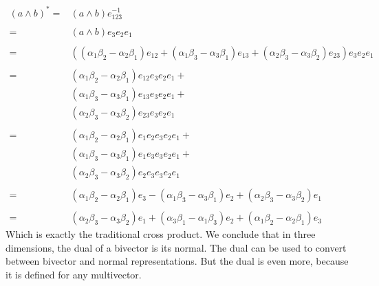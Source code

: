 \documentclass[10pt]{report}
\begin{document}
\begin{align}
    \label{eq:dual in 3d}
    (a\wedge b)^* = &(a\wedge b)e_{123}^{-1}   \nonumber\\
                  \nonumber\\
                  = &(a\wedge b)e_3e_2e_1   \nonumber\\
                  \nonumber\\
                  = &((\alpha_{1}\beta_{2} - \alpha_{2}\beta_{1})e_{12} +
                     (\alpha_{1}\beta_{3} - \alpha_{3}\beta_{1})e_{13} +
                     (\alpha_{2}\beta_{3} - \alpha_{3}\beta_{2})e_{23}) e_3e_2e_1   \nonumber\\
                  \nonumber\\
                  = &(\alpha_{1}\beta_{2} - \alpha_{2}\beta_{1})e_{12}e_3e_2e_1 + \nonumber\\
                    &(\alpha_{1}\beta_{3} - \alpha_{3}\beta_{1})e_{13}e_3e_2e_1 + \nonumber\\
                    &(\alpha_{2}\beta_{3} - \alpha_{3}\beta_{2})e_{23}e_3e_2e_1   \nonumber\\
                  \nonumber\\
                  = &(\alpha_{1}\beta_{2} - \alpha_{2}\beta_{1})e_1e_2e_3e_2e_1 + \nonumber\\
                    &(\alpha_{1}\beta_{3} - \alpha_{3}\beta_{1})e_1e_3e_3e_2e_1 + \nonumber\\
                    &(\alpha_{2}\beta_{3} - \alpha_{3}\beta_{2})e_2e_3e_3e_2e_1   \nonumber\\
                  \nonumber\\
                  = &(\alpha_{1}\beta_{2} - \alpha_{2}\beta_{1})e_3 -
                     (\alpha_{1}\beta_{3} - \alpha_{3}\beta_{1})e_2 +
                     (\alpha_{2}\beta_{3} - \alpha_{3}\beta_{2})e_1 \nonumber \\
                  \nonumber\\
                  = &(\alpha_{2}\beta_{3} - \alpha_{3}\beta_{2})e_1 +
                     (\alpha_{3}\beta_{1} - \alpha_{1}\beta_{3})e_2 +
                     (\alpha_{1}\beta_{2} - \alpha_{2}\beta_{1})e_3
\end{align}
Which is exactly the traditional cross product. We conclude that in three
dimensions, the dual of a bivector is its normal. The dual can be
used to convert between bivector and normal representations. But
the dual is even more, because it is defined for any multivector.
\end{document}
